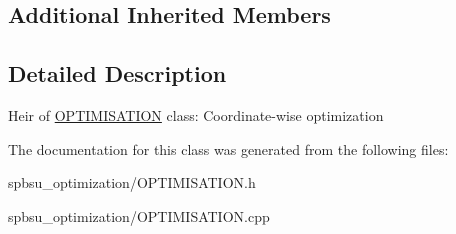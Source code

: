 \subsection*{Additional Inherited Members}


\subsection{Detailed Description}
Heir of \hyperlink{class_o_p_t_i_m_i_s_a_t_i_o_n}{O\+P\+T\+I\+M\+I\+S\+A\+T\+I\+ON} class\+: Coordinate-\/wise optimization 

The documentation for this class was generated from the following files\+:\begin{DoxyCompactItemize}
\item 
spbsu\+\_\+optimization/O\+P\+T\+I\+M\+I\+S\+A\+T\+I\+O\+N.\+h\item 
spbsu\+\_\+optimization/O\+P\+T\+I\+M\+I\+S\+A\+T\+I\+O\+N.\+cpp\end{DoxyCompactItemize}
